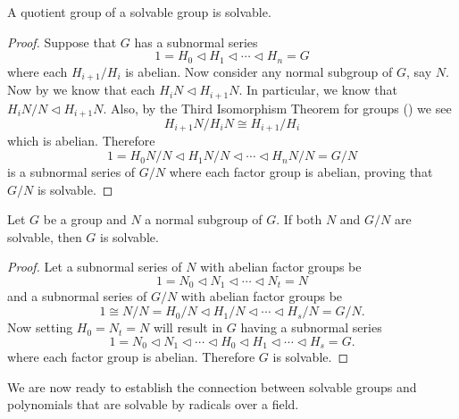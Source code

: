 \begin{theorem}\label{thrm-quotient-group-of-solvable-group-is-solvable}
    A quotient group of a solvable group is solvable.
\end{theorem}
\begin{proof}
    Suppose that $G$ has a subnormal series
    \[
        1 = H_0 \lhd H_1 \lhd \cdots \lhd H_n = G
    \]
    where each $H_{i+1}/H_i$ is abelian. Now consider any normal subgroup of $G$, say $N$. Now by  we know that each $H_iN \lhd H_{i+1}N$. In particular, we know that $H_iN/N \lhd H_{i+1}N$. Also, by the Third Isomorphism Theorem for groups () we see
    \[
        H_{i+1}N / H_iN \cong H_{i+1}/H_i
    \]
    which is abelian. Therefore
    \[
        1 = H_0N/N \lhd H_1N/N \lhd \cdots \lhd H_nN/N = G/N
    \]
    is a subnormal series of $G/N$ where each factor group is abelian, proving that $G/N$ is solvable.
\end{proof}

\begin{theorem}\label{thrm-normal-group-and-quotient-group-solvable-means-base-group-is-solvable}
    Let $G$ be a group and $N$ a normal subgroup of $G$. If both $N$ and $G/N$ are solvable, then $G$ is solvable.
\end{theorem}
\begin{proof}
    Let a subnormal series of $N$ with abelian factor groups be
    \[
        1 = N_0 \lhd N_1 \lhd \cdots \lhd N_t = N
    \]
    and a subnormal series of $G/N$ with abelian factor groups be
    \[
        1 \cong N/N = H_0/N \lhd H_1/N \lhd \cdots \lhd H_s/N = G/N.
    \]
    Now setting $H_0 = N_t = N$ will result in $G$ having a subnormal series
    \[
        1 = N_0 \lhd N_1 \lhd \cdots \lhd H_0 \lhd H_1 \lhd \cdots \lhd H_s = G.
    \]
    where each factor group is abelian. Therefore $G$ is solvable.
\end{proof}

We are now ready to establish the connection between solvable groups and polynomials that are solvable by radicals over a field.

